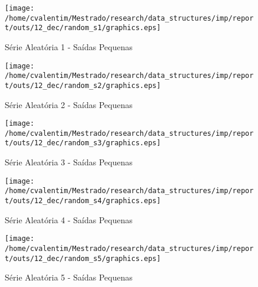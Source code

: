 \documentclass[12pt]{article}
\begin{document}
\clearpage

\begin{figure}
\begin{center}
\texttt{[image: /home/cvalentim/Mestrado/research/data\_structures/imp/report/outs/12\_dec/random\_s1/graphics.eps]}
\caption{Série Aleatória 1 - Saídas Pequenas}
\end{center}
\end{figure}

\begin{figure}
\begin{center}
\texttt{[image: /home/cvalentim/Mestrado/research/data\_structures/imp/report/outs/12\_dec/random\_s2/graphics.eps]}
\caption{Série Aleatória 2 - Saídas Pequenas}
\end{center}
\end{figure}

\begin{figure}
\begin{center}
\texttt{[image: /home/cvalentim/Mestrado/research/data\_structures/imp/report/outs/12\_dec/random\_s3/graphics.eps]}
\caption{Série Aleatória 3 - Saídas Pequenas}
\end{center}
\end{figure}

\begin{figure}
\begin{center}
\texttt{[image: /home/cvalentim/Mestrado/research/data\_structures/imp/report/outs/12\_dec/random\_s4/graphics.eps]}
\caption{Série Aleatória 4 - Saídas Pequenas}
\end{center}
\end{figure}

\begin{figure}
\begin{center}
\texttt{[image: /home/cvalentim/Mestrado/research/data\_structures/imp/report/outs/12\_dec/random\_s5/graphics.eps]}
\caption{Série Aleatória 5 - Saídas Pequenas}
\end{center}
\end{figure}




%
\end{document}
